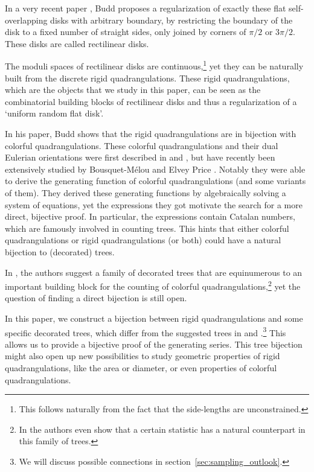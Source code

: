 \documentclass[11pt]{article}
\theoremstyle{plain}
\theoremstyle{definition}
\begin{document}
In a very recent paper \cite{Budd_rectilinear_2025}, Budd proposes a regularization of exactly these flat self-overlapping disks with arbitrary boundary, by restricting the boundary of the disk to a fixed number of straight sides, only joined by corners of $\pi/2$ or $3\pi/2$. 
These disks are called rectilinear disks.

The moduli spaces of rectilinear disks are continuous,\footnote{This follows naturally from the fact that the side-lengths are unconstrained.} yet they can be naturally built from the discrete rigid quadrangulations. 
These rigid quadrangulations, which are the objects that we study in this paper, can be seen as the combinatorial building blocks of rectilinear disks and thus a regularization of a `uniform random flat disk'.

In his paper, Budd shows that the rigid quadrangulations are in bijection with colorful quadrangulations.
These colorful quadrangulations and their dual Eulerian orientations were first described in \cite{Bonichon_number_2017} and \cite{ElveyPrice2018counting}, but have recently been extensively studied by Bousquet-Mélou and Elvey Price \cite{Bousquet-Melou_Eulerian_2020,Bousquet-Melou_generating_2020,Bousquetmelou2025refinedenumerationplanareulerian}.
Notably they were able to derive the generating function of colorful quadrangulations (and some variants of them).
They derived these generating functions by algebraically solving a system of equations, yet the expressions they got motivate the search for a more direct, bijective proof.
In particular, the expressions contain Catalan numbers, which are famously involved in counting trees. 
This hints that either colorful quadrangulations or rigid quadrangulations (or both) could have a natural bijection to (decorated) trees.

In \cite{Bousquet-Melou_generating_2020}, the authors suggest a family of decorated trees that are equinumerous to an important building block for the counting of colorful quadrangulations,\footnote{In \cite{Bousquetmelou2025refinedenumerationplanareulerian} the authors even show that a certain statistic has a natural counterpart in this family of trees.} yet the question of finding a direct bijection is still open. 

In this paper, we construct a bijection between rigid quadrangulations and some specific decorated trees, which differ from the suggested trees in \cite{Bousquet-Melou_generating_2020} and \cite{Bousquetmelou2025refinedenumerationplanareulerian}.\footnote{We will discuss possible connections in section~\ref{sec:sampling_outlook}.}
This allows us to provide a bijective proof of the generating series. 
This tree bijection might also open up new possibilities to study geometric properties of rigid quadrangulations, like the area or diameter, or even properties of colorful quadrangulations.
\end{document}
